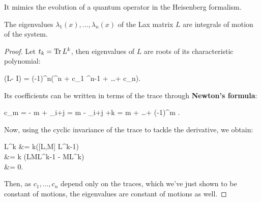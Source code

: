 \documentclass[main.tex]{subfiles}
\begin{document}
It mimics the evolution of a quantum operator in the Heisenberg formalism.

\begin{proposition}
	The eigenvalues $\lambda_1(x), \ldots, \lambda_n(x)$ of the Lax matrix $L$ are integrals of motion of the system.
\end{proposition}
\begin{proof}
	Let $t_k = \operatorname{Tr} L^k$, then eigenvalues of $L$ are roots of its characteristic polynomial:
	\begin{eqalign}
		\det(L- \lambda I) = (-1)^n(\lambda^n + c_1 \lambda^{n-1} + \ldots + c_n).
	\end{eqalign}
	Its coefficients can be written in terms of the trace through \textbf{Newton's formula}:
	\begin{eqalign}
		c_m = - m +  \sum_{i+j = m}  -  \sum_{i+j +k = m}  + \ldots + (-1)^m \frac{t_1^m}{m!}.
	\end{eqalign}
	Now, using the cyclic invariance of the trace to tackle the derivative, we obtain:
	\begin{eqalign}
		 \trace L^k &= k\trace ([L,M] L^{k-1})\\
			&= k \trace (LML^{k-1} - ML^k)\\
			&= 0.
	\end{eqalign}
	Then, as $c_1, \ldots, c_n$ depend only on the traces, which we've just shown to be constant of motions, the eigenvalues are constant of motions as well.
\end{proof}
\end{document}
